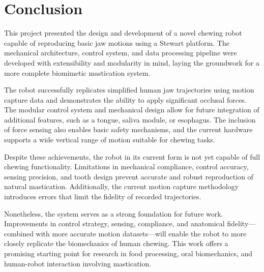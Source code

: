 \section{Conclusion}

This project presented the design and development of a novel chewing robot capable of reproducing basic jaw motions using a Stewart platform. 
The mechanical architecture, control system, and data processing pipeline were developed with extensibility and modularity in mind, laying the 
groundwork for a more complete biomimetic mastication system.

The robot successfully replicates simplified human jaw trajectories using motion capture data and demonstrates the ability to apply significant 
occlusal forces. The modular control system and mechanical design allow for future integration of additional features, such as a tongue, saliva 
module, or esophagus. The inclusion of force sensing also enables basic safety mechanisms, and the current hardware supports a wide vertical 
range of motion suitable for chewing tasks.

Despite these achievements, the robot in its current form is not yet capable of full chewing functionality. Limitations in mechanical compliance, 
control accuracy, sensing precision, and tooth design prevent accurate and robust reproduction of natural mastication. Additionally, the current 
motion capture methodology introduces errors that limit the fidelity of recorded trajectories.

Nonetheless, the system serves as a strong foundation for future work. Improvements in control strategy, sensing, compliance, and anatomical 
fidelity—combined with more accurate motion datasets—will enable the robot to more closely replicate the biomechanics of human chewing. This 
work offers a promising starting point for research in food processing, oral biomechanics, and human-robot interaction involving mastication.
